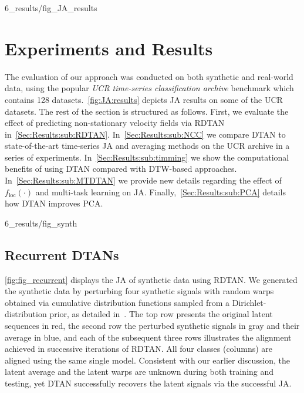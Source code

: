 {6_results/fig_JA_results}

\section{Experiments and Results}\label{Sec:Results}
The evaluation of our approach was conducted on both synthetic and real-world data, using the popular \emph{UCR time-series classification archive} benchmark which contains 128 datasets.~\autoref{fig:JA:results} depicts JA results on some of the UCR datasets.
The rest of the section is structured as follows.
First, we evaluate the effect of predicting non-stationary velocity fields via RDTAN in~\autoref{Sec:Results:sub:RDTAN}. 
In~\autoref{Sec:Results:sub:NCC} we compare DTAN to state-of-the-art time-series JA and averaging methods on the UCR archive in a series of experiments. 
In~\autoref{Sec:Results:sub:timming} we show the computational benefits of using DTAN compared with DTW-based approaches. 
In~\autoref{Sec:Results:sub:MTDTAN} we provide new details regarding the effect of $f_{\mathrm{loc}}(\cdot)$ and multi-task learning on JA.
Finally,~\autoref{Sec:Results:sub:PCA} details how DTAN improves PCA. 


{6_results/fig_synth}
\subsection{Recurrent DTANs}\label{Sec:Results:sub:RDTAN}

\autoref{fig:fig_recurrent} displays the JA of synthetic data using RDTAN.
We generated the synthetic data by perturbing four synthetic signals with random warps obtained via cumulative distribution functions sampled from a Dirichlet-distribution prior, as detailed in~\cite{Shapira:NIPS:2019:DTAN}. 
The top row presents the original latent sequences in red, the second row the perturbed synthetic signals in gray and their average in blue, and each of the subsequent three rows illustrates the alignment achieved in successive iterations of RDTAN. All four classes (columns) are aligned using the same single model. Consistent with our earlier discussion, the latent average and the latent warps are unknown during both training and testing, yet DTAN successfully recovers the latent signals via the successful JA. 

